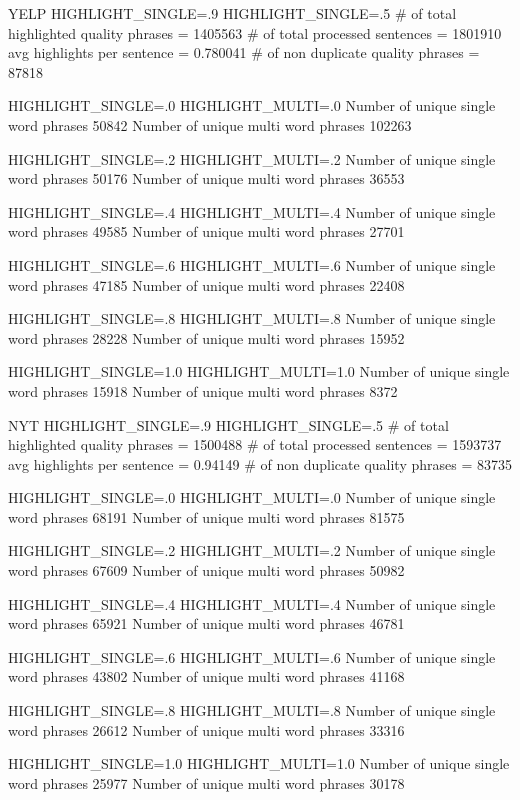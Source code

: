 YELP 
HIGHLIGHT_SINGLE=.9
HIGHLIGHT_SINGLE=.5
# of total highlighted quality phrases = 1405563
   # of total processed sentences = 1801910
   avg highlights per sentence = 0.780041
   # of non duplicate quality phrases = 87818

HIGHLIGHT_SINGLE=.0
HIGHLIGHT_MULTI=.0
Number of unique single word phrases 50842
Number of unique multi word phrases 102263

HIGHLIGHT_SINGLE=.2
HIGHLIGHT_MULTI=.2
Number of unique single word phrases 50176
Number of unique multi word phrases 36553

HIGHLIGHT_SINGLE=.4
HIGHLIGHT_MULTI=.4
Number of unique single word phrases 49585
Number of unique multi word phrases 27701

HIGHLIGHT_SINGLE=.6
HIGHLIGHT_MULTI=.6
Number of unique single word phrases 47185
Number of unique multi word phrases 22408

HIGHLIGHT_SINGLE=.8
HIGHLIGHT_MULTI=.8
Number of unique single word phrases 28228
Number of unique multi word phrases 15952

HIGHLIGHT_SINGLE=1.0
HIGHLIGHT_MULTI=1.0
Number of unique single word phrases 15918
Number of unique multi word phrases 8372


NYT
HIGHLIGHT_SINGLE=.9
HIGHLIGHT_SINGLE=.5
# of total highlighted quality phrases = 1500488
   # of total processed sentences = 1593737
   avg highlights per sentence = 0.94149
   # of non duplicate quality phrases = 83735

HIGHLIGHT_SINGLE=.0
HIGHLIGHT_MULTI=.0
Number of unique single word phrases 68191
Number of unique multi word phrases 81575

HIGHLIGHT_SINGLE=.2
HIGHLIGHT_MULTI=.2
Number of unique single word phrases 67609
Number of unique multi word phrases 50982

HIGHLIGHT_SINGLE=.4
HIGHLIGHT_MULTI=.4
Number of unique single word phrases 65921
Number of unique multi word phrases 46781

HIGHLIGHT_SINGLE=.6
HIGHLIGHT_MULTI=.6
Number of unique single word phrases 43802
Number of unique multi word phrases 41168

HIGHLIGHT_SINGLE=.8
HIGHLIGHT_MULTI=.8
Number of unique single word phrases 26612
Number of unique multi word phrases 33316

HIGHLIGHT_SINGLE=1.0
HIGHLIGHT_MULTI=1.0
Number of unique single word phrases 25977
Number of unique multi word phrases 30178